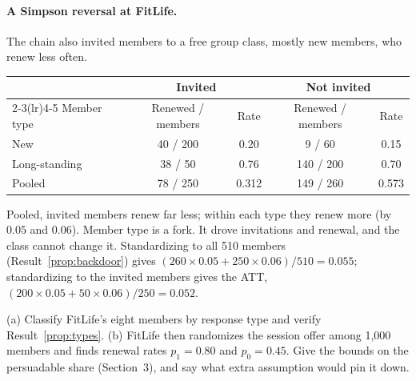 \documentclass[11pt]{article}
\begin{document}
\paragraph{A Simpson reversal at FitLife.} The chain also invited members to a free group class, mostly
new members, who renew less often.
\begin{center}
\begin{tabular}{lcccc}
\toprule
 & \multicolumn{2}{c}{Invited} & \multicolumn{2}{c}{Not invited} \\
\cmidrule(lr){2-3}\cmidrule(lr){4-5}
Member type & Renewed / members & Rate & Renewed / members & Rate \\
\midrule
New & 40 / 200 & 0.20 & 9 / 60 & 0.15 \\
Long-standing & 38 / 50 & 0.76 & 140 / 200 & 0.70 \\
\midrule
Pooled & 78 / 250 & 0.312 & 149 / 260 & 0.573 \\
\bottomrule
\end{tabular}
\end{center}
Pooled, invited members renew far less; within each type they renew more (by $0.05$ and $0.06$). Member
type is a fork. It drove invitations and renewal, and the class cannot change it. Standardizing to all 510
members (Result~\ref{prop:backdoor}) gives $(260 \times 0.05 + 250 \times 0.06)/510 = 0.055$; standardizing to
the invited members gives the ATT, $(200 \times 0.05 + 50 \times 0.06)/250 = 0.052$.

\begin{center}
\end{center}

\begin{exercise}[computation]
(a) Classify FitLife's eight members by response type and verify Result~\ref{prop:types}. (b) FitLife then
randomizes the session offer among 1{,}000 members and finds renewal rates $p_1 = 0.80$ and $p_0 = 0.45$.
Give the bounds on the persuadable share (Section~3), and say what extra assumption would pin it down.
\end{exercise}
\end{document}
